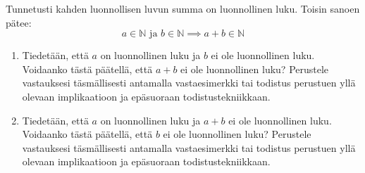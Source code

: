 \documentclass[12pt,a4paper]{article}
\newcommand{\N}{\mathbb{N}}
\begin{document}
\pagebreak
{}
  Tunnetusti kahden luonnollisen luvun summa on luonnollinen luku. Toisin sanoen pätee:
  \[
    a\in \N \textrm{ ja } b\in \N \implies a + b\in\N
  \]
  \begin{enumerate}
  \item Tiedetään, että $a$ on luonnollinen luku ja $b$ ei ole luonnollinen luku. Voidaanko tästä päätellä, että $a + b$ ei ole luonnollinen luku? Perustele vastauksesi täsmällisesti antamalla vastaesimerkki tai todistus perustuen yllä olevaan implikaatioon ja epäsuoraan todistustekniikkaan.
  \item Tiedetään, että $a$ on luonnollinen luku ja $a + b$ ei ole luonnollinen luku. Voidaanko tästä päätellä, että $b$ ei ole luonnollinen luku? Perustele vastauksesi täsmällisesti antamalla vastaesimerkki tai todistus perustuen yllä olevaan implikaatioon ja epäsuoraan todistustekniikkaan.
  \end{enumerate}
\end{document}
